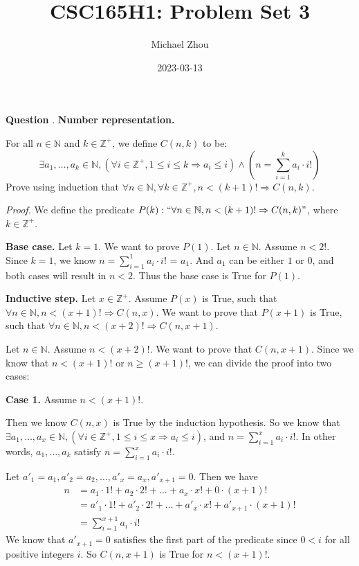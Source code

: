 \documentclass{article}
\title{CSC165H1: Problem Set 3}
\author{Michael Zhou}
\date{2023-03-13}
\newcounter{qcount}
\newcommand\q{\stepcounter{qcount} \textbf{Question \theqcount}. }
\begin{document}
\maketitle
\q \textbf{Number representation.}

For all $n \in \mathbb{N}$ and $k \in \mathbb{Z}^+$, we define $C (n, k)$ 
to be:
$$\exists a_1, \ldots, a_k \in \mathbb{N}, (\forall i \in \mathbb{Z}^+, 
1 \leq i \leq k \Rightarrow a_i \leq i) \land (n = \sum_{i=1}^{k} a_i 
\cdot i!)$$
Prove using induction that $\forall n \in \mathbb{N}, \forall k \in 
\mathbb{Z}^+, n < (k+1)! \Rightarrow C (n, k)$.

\textit{Proof.} We define the predicate $P (k):
`` \forall n \in \mathbb{N}, n < (k +1 )! \Rightarrow C (n, k) "
$, where $k \in \mathbb{Z}^+$. 

\textbf{Base case.} Let $k = 1$. We want to prove $P(1)$. Let $n \in \mathbb{N}$. 
Assume $n < 2!$. Since $k = 1$, we know $n = \sum_{i=1}^{1} a_i 
\cdot i!$ = $a_1$. And $a_1$ can be either $1$ or $0$, and both cases will result in 
$n< 2$. Thus the base case is True for $P(1)$.

\textbf{Inductive step.} Let $x \in \mathbb{Z}^+$. Assume $P(x)$ is True, such that 
$\forall n \in \mathbb{N}, n < (x + 1)! \Rightarrow C (n , x)$. We want to 
prove that $P(x+1)$ is True, such that $\forall n \in \mathbb{N}, n < 
(x + 2)! \Rightarrow C (n, x + 1)$. 

Let $n \in \mathbb{N}$. Assume $n < (x + 2)!$. We want to prove that $
C(n, x + 1) $. Since we know that $n < (x + 1)!$ or $n \geq (x + 1)!$, we 
can divide the proof into two cases:

\textbf{Case 1.} Assume $n < ( x + 1)!$.

Then we know $C (n , x)$ is True by the induction hypothesis. So we know that
$\exists a_1, \ldots, a_x \in \mathbb{N}, (\forall i \in \mathbb{Z}^+, 
1 \leq i \leq x \Rightarrow a_i \leq i)$, and $n = \sum_{i=1}^{x} a_i \cdot 
i!$. In other words, $a_1, \ldots, a_k$ satisfy $n = \sum_{i=1}^{x} a_i \cdot 
i!$. 

Let $a'_1 = a_1, a'_2 = a_2, \ldots, a'_x = a_x, a'_ {x + 1} = 0$. Then 
we have 
\begin{align*}
    n  &= a_1 \cdot 1! + a_2 \cdot 2! + \ldots + a_x \cdot x! + 0 \cdot (x+1)!\\
       &= a'_1 \cdot 1! + a'_2 \cdot 2! + \ldots + a'_x \cdot x! + a'_ {x+1} 
       \cdot (x+1)!\\
     &= \sum_{i=1}^{x+1} a_i \cdot i!
\end{align*}
We know that $a'_ {x+1} = 0$ satisfies the first part of the predicate 
since $0 < i$ for all positive integers $i$.
So $C (n, x + 1)$ is True for $n < (x + 1)!$.
\end{document}

